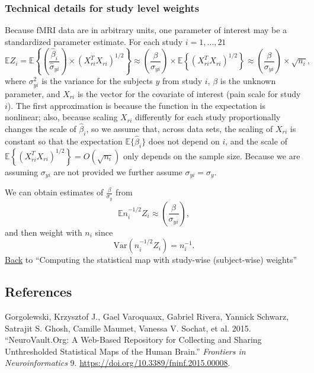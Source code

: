 \documentclass[]{article}
\begin{document}
\hypertarget{technical-details-for-study-level-weights}{%
\subsubsection{Technical details for study level
weights}\label{technical-details-for-study-level-weights}}

Because fMRI data are in arbitrary units, one parameter of interest may
be a standardized parameter estimate. For each study \(i=1, \ldots, 21\)
\[ \mathbb{E} Z_i = \mathbb{E} \left\{\left(\frac{\hat{\beta}_i}{ \hat{\sigma}_{yi}}\right) \times (X_{ri}^TX_{ri})^{1/2} \right\}
\approx \left(\frac{\beta}{\sigma_{yi}}\right) \times \mathbb{E}\left\{(X_{ri}^TX_{ri})^{1/2} \right\} \approx \left(\frac{\beta}{\sigma_{yi}} \right) \times \sqrt{n_i},\]
where \(\sigma^2_{yi}\) is the variance for the subjects \(y\) from
study \(i\), \(\beta\) is the unknown parameter, and \(X_{ri}\) is the
vector for the covariate of interest (pain scale for study \(i\)). The
first approximation is because the function in the expectation is
nonlinear; also, because scaling \(X_{ri}\) differently for each study
proportionally changes the scale of \(\hat \beta_i\), so we assume that,
across data sets, the scaling of \(X_{ri}\) is constant so that the
expectation \(\mathbb{E}\{\hat{\beta}_i\}\) does not depend on \(i\),
and the scale of
\(\mathbb{E}\left\{(X_{ri}^TX_{ri})^{1/2} \right\} = O(\sqrt{n_i})\)
only depends on the sample size. Because we are assuming \(\sigma_{yi}\)
are not provided we further assume \(\sigma_{yi} = \sigma_y\).

We can obtain estimates of \(\frac{\beta}{\sigma_y}\) from \[
\mathbb{E}n_i^{-1/2}Z_i \approx \left(\frac{\beta}{\sigma_{yi}} \right),
\] and then weight with \(n_i\) since \[
\text{Var}(n_i^{-1/2} Z_i) = n_i^{-1}.
\] \protect\hyperlink{technical_details_return}{Back} to ``Computing the
statistical map with study-wise (subject-wise) weights''

\hypertarget{references}{%
\subsection*{References}\label{references}}

\hypertarget{refs}{}
\leavevmode\hypertarget{ref-gorgolewski_neurovault.org:_2015}{}%
Gorgolewski, Krzysztof J., Gael Varoquaux, Gabriel Rivera, Yannick
Schwarz, Satrajit S. Ghosh, Camille Maumet, Vanessa V. Sochat, et al.
2015. ``NeuroVault.Org: A Web-Based Repository for Collecting and
Sharing Unthresholded Statistical Maps of the Human Brain.''
\emph{Frontiers in Neuroinformatics} 9.
\url{https://doi.org/10.3389/fninf.2015.00008}.
\end{document}
